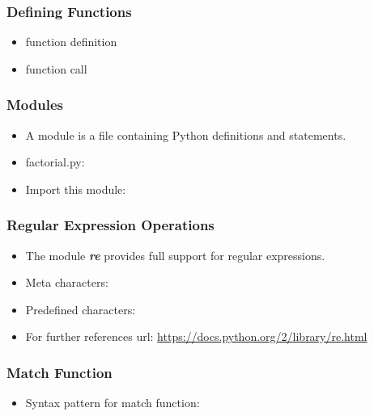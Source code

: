\documentclass[11pt]{beamer}
\begin{document}
\begin{frame}[plain]
    \frametitle{Defining Functions}
    \begin{itemize}
        \item[] function definition 
        
        \pause
        \item[] function call  
        
    \end{itemize}
\end{frame}
\begin{frame}[plain]
    \frametitle{Modules}
    \begin{itemize}
        \item[] A module is a file containing Python definitions and statements. 
        \pause
        \item[] factorial.py:
        
        \pause
        \item[] Import this module: 
        
    \end{itemize}
\end{frame}
\begin{frame}[plain]
    \frametitle{Regular Expression Operations}
    \begin{itemize}
        \item[] The module \textbf{\textit{re}} provides full support for regular expressions. 
        \pause
        \item[] Meta characters:
        
        \pause
        \item[] Predefined characters:
        
        \pause
        \item[] For further references url: \url{https://docs.python.org/2/library/re.html} 
    \end{itemize}
\end{frame}
\begin{frame}[plain]
    \frametitle{Match Function}
    \begin{itemize}
        \item[] Syntax pattern for match function:
        \newline
         
        \pause
        
    \end{itemize}
\end{frame}
\end{document}
